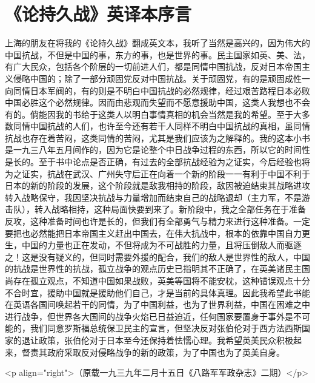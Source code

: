 \section[《论持久战》英译本序言（一九三九年一月二十日）]{《论持久战》英译本序言}


上海的朋友在将我的《论持久战》翻成英文本，我听了当然是高兴的，因为伟大的中国抗战，不但是中国的事，东方的事，也是世界的事。民主国家如英、美、法，有广大民众，包括各个阶层的一切前进人们，都是同情中国抗战，反对日本帝国主义侵略中国的；除了一部分顽固党反对中国抗战。关于顽固党，有的是顽固成性一向同情日本军阀的，有的则是不明白中国抗战的必然规律，经过艰苦路程日本必败中国必胜这个必然规律。因而由悲观而失望而不愿意援助中国，这类人我想也不会有的。倘能因我的书给于这类人以明白事情真相的机会当然是我的希望。至于大多数同情中国抗战的人们，也许至今还有若干人同样不明白中国抗战的真相，虽同情抗战也存在着苦闷，这类同情的苦闷，尤其是我们应该为之解释的。我的这本小书是一九三八年五月间作的，因为它是论整个中日战争过程的东西，所以它的时间性是长的。至于书中论点是否正确，有过去的全部抗战经验为之证实，今后经验也将为之证实，抗战在武汉、广州失守后正在向着一个新的阶段一一有利于中国不利于日本的新的阶段的发展，这个阶段就是敌我相持的阶段，敌因被迫结束其战略进攻转入战略保守，我因坚决抗战与力量增加而结束自己的战略退却（主力军，不是游击队），转入战略相持，这种局面快要到来了。新阶段中，我之全部任务在于准备反攻，这种准备时间也许是长的，但我们有全部勇气与精力来进行这种准备。一定要把也必然能把日本帝国主义赶出中国去，在伟大抗战中，根本的依靠中国自力更生，中国的力量也正在发动，不但将成为不可战胜的力量，且将压倒敌人而驱逐之！这是没有疑义的，但同时需要外援的配合，我们的敌人是世界性的敌人，中国的抗战是世界性的抗战，孤立战争的观点历史已指明其不正确了，在英美诸民主国尚存在孤立观点，不知道中国如果战败，英美等国将不能安枕，这种错误观点十分不合时宜，援助中国就是援助他们自己，才是当前的具体真理。因此我希望此书能在英语各国间唤起若干的同情，为了中国利益，也为了世界利益，中国在困难之中进行战争，但世界各大国间的战争火焰已日益迫近，任何国家要置身于事外是不可能的，我们同意罗斯福总统保卫民主的宣言，但坚决反对张伯伦对于西方法西斯国家的退让政策，张伯伦对于日本至今还保持着怯懦心理。我希望英美民众积极起来，督责其政府采取反对侵略战争的新的政策，为了中国也为了英美自身。

<p align="right">（原载一九三九年二月十五日《八路军军政杂志》二期）</p>

